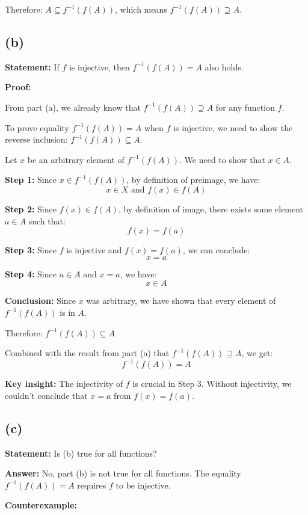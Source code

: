 \documentclass[12pt,a4paper]{article}
\theoremstyle{definition}
\theoremstyle{remark}
\begin{document}
Therefore: $A \subseteq f^{-1}(f(A))$, which means $f^{-1}(f(A)) \supseteq A$.



\subsection*{(b)}

\textbf{Statement:} If $f$ is injective, then $f^{-1}(f(A)) = A$ also holds.

\textbf{Proof:}

From part (a), we already know that $f^{-1}(f(A)) \supseteq A$ for any function $f$.

To prove equality $f^{-1}(f(A)) = A$ when $f$ is injective, we need to show the reverse inclusion: $f^{-1}(f(A)) \subseteq A$.

Let $x$ be an arbitrary element of $f^{-1}(f(A))$. We need to show that $x \in A$.

\textbf{Step 1:} Since $x \in f^{-1}(f(A))$, by definition of preimage, we have:
$$x \in X \text{ and } f(x) \in f(A)$$

\textbf{Step 2:} Since $f(x) \in f(A)$, by definition of image, there exists some element $a \in A$ such that:
$$f(x) = f(a)$$

\textbf{Step 3:} Since $f$ is injective and $f(x) = f(a)$, we can conclude:
$$x = a$$

\textbf{Step 4:} Since $a \in A$ and $x = a$, we have:
$$x \in A$$

\textbf{Conclusion:} Since $x$ was arbitrary, we have shown that every element of $f^{-1}(f(A))$ is in $A$.

Therefore: $f^{-1}(f(A)) \subseteq A$

Combined with the result from part (a) that $f^{-1}(f(A)) \supseteq A$, we get:
$$f^{-1}(f(A)) = A$$

\textbf{Key insight:} The injectivity of $f$ is crucial in Step 3. Without injectivity, we couldn't conclude that $x = a$ from $f(x) = f(a)$.

\subsection*{(c)}

\textbf{Statement:} Is (b) true for all functions?

\textbf{Answer:} No, part (b) is not true for all functions. The equality $f^{-1}(f(A)) = A$ requires $f$ to be injective.

\textbf{Counterexample:}
\end{document}
